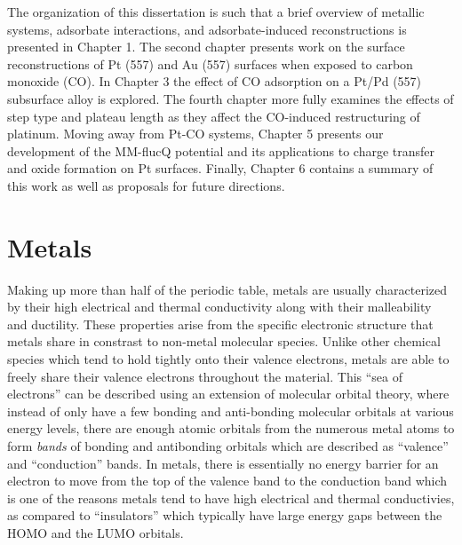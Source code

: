 
The organization of this dissertation is such that a brief overview of metallic
systems, adsorbate interactions, and adsorbate-induced reconstructions is
presented in Chapter 1.  The second chapter presents work on the surface
reconstructions of Pt (557) and Au (557) surfaces when exposed to carbon
monoxide (CO). In Chapter 3 the effect of CO adsorption on a Pt/Pd (557)
subsurface alloy is explored. The fourth chapter more fully examines the
effects of step type and plateau length as they affect the CO-induced
restructuring of platinum. Moving away from Pt-CO systems, Chapter 5 presents
our development of the MM-flucQ potential and its applications to charge
transfer and oxide formation on Pt surfaces. Finally, Chapter 6 contains a
summary of this work as well as proposals for future directions.

\section{Metals}
Making up more than half of the periodic table, metals are usually
characterized by their high electrical and thermal conductivity along with
their malleability and ductility. These properties arise from the specific
electronic structure that metals share in constrast to non-metal molecular
species. Unlike other chemical species which tend to hold tightly onto their
valence electrons, metals are able to freely share their valence electrons
throughout the material.  This ``sea of electrons'' can be described using an
extension of molecular orbital theory, where instead of only have a few bonding
and anti-bonding molecular orbitals at various energy levels, there are enough
atomic orbitals from the numerous metal atoms to form {\em bands} of bonding
and antibonding orbitals which are described as ``valence'' and ``conduction''
bands. In metals, there is essentially no energy barrier for an electron to
move from the top of the valence band to the conduction band which is one of
the reasons metals tend to have high electrical and thermal conductivies, as
compared to ``insulators'' which typically have large energy gaps between the
HOMO and the LUMO orbitals.


